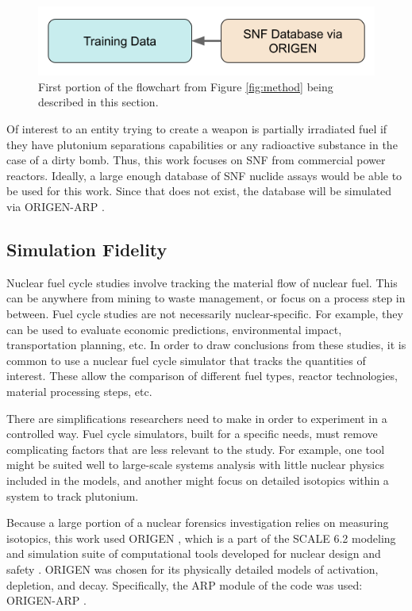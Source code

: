 \begin{figure}[H]
  \centering
  \includegraphics[width=0.7\linewidth]{./chapters/method/methodology1.png}
  \caption{First portion of the flowchart from Figure \ref{fig:method} being 
           described in this section.}
\end{figure}

Of interest to an entity trying to create a weapon is partially irradiated fuel
if they have plutonium separations capabilities or any radioactive substance in
the case of a dirty bomb. Thus, this work focuses on \gls{SNF} from commercial
power reactors. Ideally, a large enough database of \gls{SNF} nuclide assays
would be able to be used for this work. Since that does not exist, the 
database will be simulated via \gls{ORIGEN-ARP} \cite{origen, origenarp}.  

\subsection{Simulation Fidelity}
\label{sec:fidelity}

Nuclear fuel cycle studies involve tracking the material flow of nuclear fuel.
This can be anywhere from mining to waste management, or focus on a process
step in between. Fuel cycle studies are not necessarily nuclear-specific. For
example, they can be used to evaluate economic predictions, environmental
impact, transportation planning, etc.  In order to draw conclusions from these
studies, it is common to use a nuclear fuel cycle simulator that tracks the
quantities of interest. These allow the comparison of different fuel types,
reactor technologies, material processing steps, etc. 

There are simplifications researchers need to make in order to experiment in a
controlled way. Fuel cycle simulators, built for a specific needs, must remove
complicating factors that are less relevant to the study.  For example, one
tool might be suited well to large-scale systems analysis with little nuclear
physics included in the models, and another might focus on detailed isotopics
within a system to track plutonium.

Because a large portion of a nuclear forensics investigation relies on
measuring isotopics, this work used \gls{ORIGEN} \cite{origen}, which is a part
of the \gls{SCALE} 6.2 modeling and simulation suite of computational tools
developed for nuclear design and safety \cite{scale}. \gls{ORIGEN} was chosen
for its physically detailed models of activation, depletion, and decay.
Specifically, the ARP module of the code was used: \gls{ORIGEN-ARP}
\cite{origenarp}.

